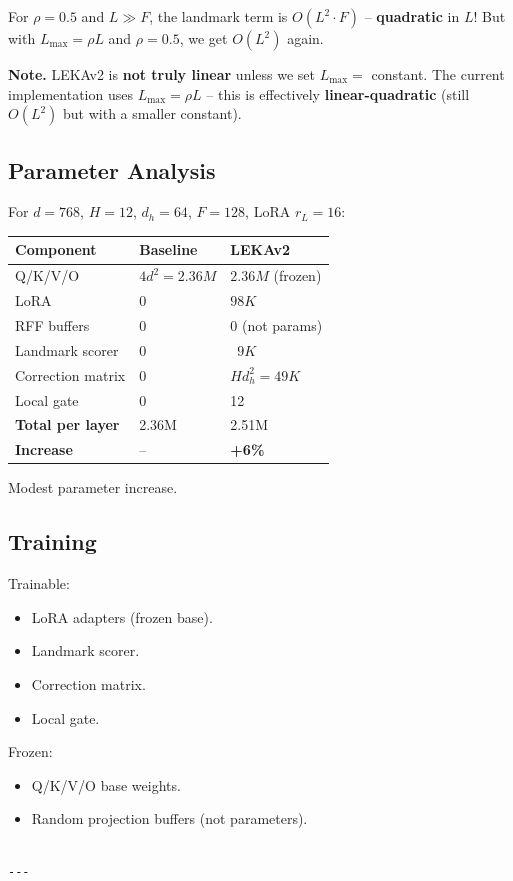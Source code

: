 For $\rho = 0.5$ and $L \gg F$, the landmark term is 
$O(L^2 \cdot F)$ -- \textbf{quadratic} in $L$! But with $L_\text{max} = \rho L$ 
and $\rho = 0.5$, we get $O(L^2)$ again.

\textbf{Note.} LEKAv2 is \textbf{not truly linear} unless we set $L_\text{max} = $ 
constant. The current implementation uses $L_\text{max} = \rho L$ -- this 
is effectively \textbf{linear-quadratic} (still $O(L^2)$ but with a smaller 
constant).

\subsection{Parameter Analysis}

For $d = 768$, $H = 12$, $d_h = 64$, $F = 128$, LoRA $r_L = 16$:

\begin{table}[H]
\centering
\small
\begin{tabular}{lll}
\toprule
\textbf{Component} & \textbf{Baseline} & \textbf{LEKAv2} \\
\midrule
Q/K/V/O & $4 d^2 = 2.36M$ & $2.36M$ (frozen) \\
LoRA & 0 & $98K$ \\
RFF buffers & 0 & 0 (not params) \\
Landmark scorer & 0 & ~$9K$ \\
Correction matrix & 0 & $H d_h^2 = 49K$ \\
Local gate & 0 & 12 \\
\textbf{Total per layer} & 2.36M & 2.51M \\
\textbf{Increase} & -- & \textbf{+6\%} \\
\bottomrule
\end{tabular}
\end{table}

Modest parameter increase.

\subsection{Training}

Trainable:
\begin{itemize}
\item LoRA adapters (frozen base).
\item Landmark scorer.
\item Correction matrix.
\item Local gate.

\end{itemize}
Frozen:
\begin{itemize}
\item Q/K/V/O base weights.
\item Random projection buffers (not parameters).
\end{itemize}
\begin{lstlisting}

---
\end{lstlisting}